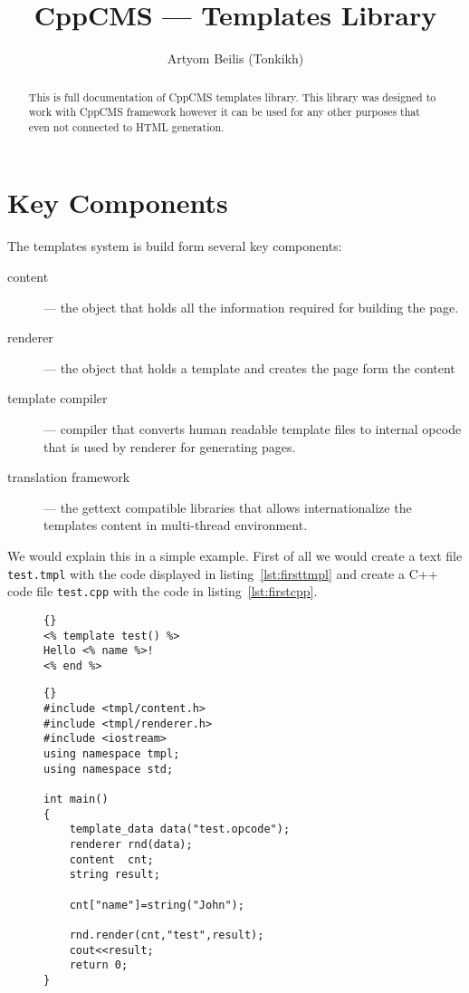 \documentclass{article}
\title{CppCMS --- Templates Library}
\author{Artyom Beilis (Tonkikh)}
\newcommand{\tw}[1]{\texttt{#1}}
\begin{document}
\maketitle
\tableofcontents
\lstlistoflistings
\begin{abstract}
This is full documentation of CppCMS templates library. This library was designed to work with CppCMS framework however
it can be used for any other purposes that even not connected to HTML generation.
\end{abstract}
\section{Key Components}
The templates system is build form several key components:
\begin{description}
\item[content] --- the object that holds all the information required for building the page.
\item[renderer] --- the object that holds a template and creates the page form the content
\item[template compiler] --- compiler that converts human readable template files to internal opcode that is used by renderer for generating pages.
\item[translation framework] --- the gettext compatible libraries that allows internationalize the templates content in multi-thread environment.
\end{description}

We would explain this in a simple example.
First of all we would create a text file \tw{test.tmpl} with the
code displayed in listing~\ref{lst:firsttmpl} and create a C++ code file \tw{test.cpp}
with the code in listing~\ref{lst:firstcpp}.

\begin{figure}
\begin{lstlisting}[label=lst:firsttmpl,caption=Frist Template]{}
<% template test() %>
Hello <% name %>!
<% end %>
\end{lstlisting}
\end{figure}


\begin{figure}
\begin{lstlisting}[label=lst:firstcpp,caption=Frist C++ Code]{}
#include <tmpl/content.h>
#include <tmpl/renderer.h>
#include <iostream>
using namespace tmpl;
using namespace std;

int main()
{
	template_data data("test.opcode");
	renderer rnd(data);
	content  cnt;
	string result;

	cnt["name"]=string("John");
	
	rnd.render(cnt,"test",result);
	cout<<result;
	return 0;
}
\end{lstlisting}
\end{figure}
\end{document}

